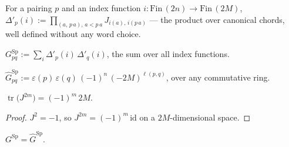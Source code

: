 \begin{definition}\label{def:delta_contr}
\leanok
{}
For a pairing $p$ and an index function
$i:\mathrm{Fin}\,(2n)\to\mathrm{Fin}\,(2M)$,
$\Delta'_p(i) := \prod_{(a,\,p\,a),\,a<p\,a} J_{i(a),\,i(p\,a)}$ --- the
product over canonical chords, well defined without any word choice.
\end{definition}

\begin{definition}\label{def:symp_gram_contr}
\leanok
{}
$G^{\mathrm{Sp}}_{pq} := \sum_i \Delta'_p(i)\,\Delta'_q(i)$, the sum over
all index functions.
\end{definition}

\begin{definition}\label{def:symp_gram_closed}
\leanok
{}
$\widehat G^{\mathrm{Sp}}_{pq} := \varepsilon(p)\,\varepsilon(q)\,
(-1)^n\,(-2M)^{\ell(p,q)}$, over any commutative ring.
\end{definition}

\begin{lemma}\label{lem:trace_j_pow}
\leanok
{}
$\operatorname{tr}\bigl(J^{2m}\bigr) = (-1)^m\,2M$.
\end{lemma}

\begin{proof}
\leanok
$J^2=-1$, so $J^{2m}=(-1)^m\,\mathrm{id}$ on a $2M$-dimensional space.
\end{proof}

\begin{theorem}\label{thm:crossing_sign}
\leanok
$G^{\mathrm{Sp}} = \widehat G^{\mathrm{Sp}}$.
\end{theorem}


